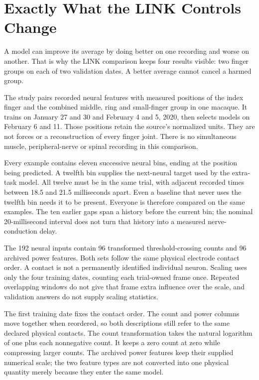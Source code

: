 \section{Exactly What the LINK Controls Change}

A model can improve its average by doing better on one recording and worse
on another. That is why the LINK comparison keeps four results visible:
two finger groups on each of two validation dates. A better average cannot
cancel a harmed group.

The study pairs recorded neural features with measured positions of the index
finger and the combined middle, ring and small-finger group in one macaque.
It trains on January 27 and 30 and February 4 and 5, 2020, then selects models
on February 6 and 11. Those positions retain the source's normalized units.
They are not forces or a reconstruction of every finger joint. There is no
simultaneous muscle, peripheral-nerve or spinal recording in this comparison.

Every example contains eleven successive neural bins, ending at the position
being predicted. A twelfth bin supplies the next-neural target used by the
extra-task model. All twelve must be in the same trial, with adjacent recorded
times between 18.5 and 21.5 milliseconds apart. Even a baseline that never
uses the twelfth bin needs it to be present. Everyone is therefore compared
on the same examples. The ten earlier gaps span a history before the current
bin; the nominal 20-millisecond interval does not turn that history into a
measured nerve-conduction delay.

The 192 neural inputs contain 96 transformed threshold-crossing counts and
96 archived power features. Both sets follow the same physical electrode
contact order. A contact is not a permanently identified individual neuron.
Scaling uses only the four training dates, counting each trial-owned frame
once. Repeated overlapping windows do not give that frame extra influence
over the scale, and validation answers do not supply scaling statistics.

The first training date fixes the contact order. The count and power columns
move together when reordered, so both descriptions still refer to the same
declared physical contacts. The count transformation takes the natural
logarithm of one plus each nonnegative count. It keeps a zero count at zero
while compressing larger counts. The archived power features keep their
supplied numerical scale; the two feature types are not converted into one
physical quantity merely because they enter the same model.

